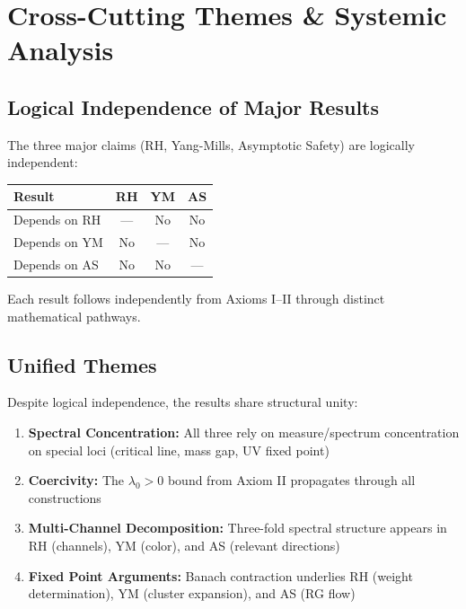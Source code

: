 \documentclass[12pt, a4paper]{article}
\theoremstyle{definition}
\theoremstyle{remark}
\begin{document}
\section{Cross-Cutting Themes \& Systemic Analysis}

\subsection{Logical Independence of Major Results}

The three major claims (RH, Yang-Mills, Asymptotic Safety) are logically independent:

\begin{center}
\begin{tabular}{|l|c|c|c|}
\hline
\textbf{Result} & \textbf{RH} & \textbf{YM} & \textbf{AS} \\
\hline
Depends on RH & --- & No & No \\
Depends on YM & No & --- & No \\
Depends on AS & No & No & --- \\
\hline
\end{tabular}
\end{center}

Each result follows independently from Axioms I--II through distinct mathematical pathways.

\subsection{Unified Themes}

Despite logical independence, the results share structural unity:

\begin{enumerate}
    \item \textbf{Spectral Concentration:} All three rely on measure/spectrum concentration on special loci (critical line, mass gap, UV fixed point)

    \item \textbf{Coercivity:} The $\lambda_0 > 0$ bound from Axiom II propagates through all constructions

    \item \textbf{Multi-Channel Decomposition:} Three-fold spectral structure appears in RH (channels), YM (color), and AS (relevant directions)

    \item \textbf{Fixed Point Arguments:} Banach contraction underlies RH (weight determination), YM (cluster expansion), and AS (RG flow)
\end{enumerate}
\end{document}
